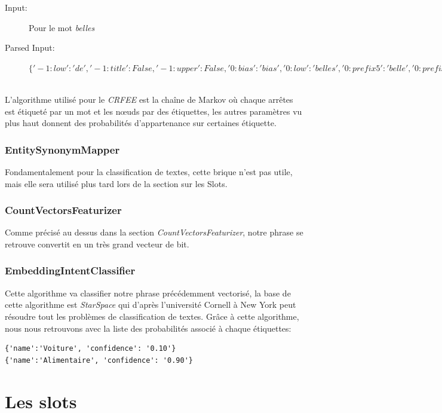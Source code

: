 \begin{description}
\item[Input:] Pour le mot \textit{belles}
\item[Parsed Input:] $\{'-1:low': 'de', '-1:title': False, '-1:upper': False, 
'0:bias': 'bias', '0:low': 'belles', '0:prefix5': 'belle', '0:prefix2': 
'be', '0:suffix5': 'elles', '0:suffix3': 'les', '0:suffix2': 'es', 
'0:upper': False, '0:title': False, '0:digit': False, '1:low': 'pommes',
'1:title': False, '1:upper': False\}$
\end{description}
\ \\
L'algorithme utilisé pour le \textit{CRFEE} est la chaîne de Markov où chaque arrêtes est étiqueté par un mot et les nœuds par des étiquettes, les autres paramètres vu plus haut donnent des probabilités d'appartenance sur certaines étiquette.

\subsubsection{EntitySynonymMapper}
Fondamentalement pour la classification de textes, cette brique n'est pas utile, mais elle sera utilisé plus tard lors de la section sur les Slots.

\subsubsection{CountVectorsFeaturizer}
Comme précisé au dessus dans la section \textit{CountVectorsFeaturizer}, notre phrase se retrouve convertit en un très grand vecteur de bit.

\subsubsection{EmbeddingIntentClassifier}
Cette algorithme va classifier notre phrase précédemment vectorisé, la base de cette algorithme est \textit{StarSpace} qui d'après l'université Cornell à New York peut résoudre tout les problèmes de classification de textes.\linebreak
Grâce à cette algorithme, nous nous retrouvons avec la liste des probabilités associé à chaque étiquettes:

\begin{lstlisting}
{'name':'Voiture', 'confidence': '0.10'}
{'name':'Alimentaire', 'confidence': '0.90'}
\end{lstlisting}

\pagebreak
\section{Les slots}

